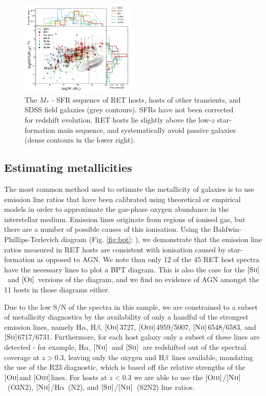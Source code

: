 \documentclass[fleqn,usenatbib,]{mnras}
\newcommand{\halpha}[0]{H$\alpha$}
\newcommand{\hbeta}[0]{H$\beta$}
\newcommand{\OII}[0]{$[\textnormal{\textsc{Oii}}]$}
\newcommand{\OI}[0]{$[\textnormal{\textsc{Oi}}]$}
\newcommand{\OIII}[0]{$[\textnormal{\textsc{Oiii}}]$}
\newcommand{\SII}[0]{$[\textnormal{\textsc{Sii}}]$}
\newcommand{\NII}[0]{$[\textnormal{\textsc{Nii}}]$}
\begin{document}
\begin{figure}
\includegraphics[width=0.5\textwidth]{figs/SFR_Mike.png}
\caption{The $M_*$ - SFR sequence of RET hosts, hosts of other transients, and SDSS field galaxies (grey contours). SFRs have not been corrected for redshift evolution. RET hosts lie slightly above the low-$z$ star-formation main sequence, and systematically avoid passive galaxies (dense contours in the lower right).
\label{fig:sfms_sfr}}
\end{figure}


\subsection{Estimating metallicities \label{subsec:calc_Z}}

The most common method used to estimate the metallicity of galaxies is to use emission line ratios that have been calibrated using theoretical or empirical models in order to approximate the gas-phase oxygen abundance in the interstellar medium. Emission lines originate from regions of ionised gas, but there are a number of possible causes of this ionisation. Using the Baldwin-Phillips-Terlevich diagram (Fig. \ref{fig:bpt}; \citealt{Baldwin1981}), we demonstrate that the emission line ratios measured in RET hosts are consistent with ionisation caused by star-formation as opposed to AGN. We note than only 12 of the 45 RET host spectra have the necessary lines to plot a BPT diagram. This is also the case for the \SII~and \OI~versions of the diagram, and we find no evidence of AGN amongst the 11 hosts in those diagrams either.

Due to the low S/N of the spectra in this sample, we are constrained to a subset of metallicity diagnostics by the availability of only a handful of the strongest emission lines, namely \halpha, \hbeta, \OII 3727, \OIII 4959/5007, \NII 6548/6583, and \SII 6717/6731. Furthermore, for each host galaxy only a subset of these lines are detected - for example, \halpha, \NII~and \SII~are redshifted out of the spectral coverage at $z>0.3$, leaving only the oxygen and \hbeta~lines available, mandating the use of the R23 diagnostic, which is based off the relative strengths of the \OII and \OIII lines. For hosts at $z<0.3$ we are able to use the \OIII /\NII~(O3N2), \NII /\halpha~(N2), and \SII /\NII~(S2N2) line ratios. 
\end{document}
